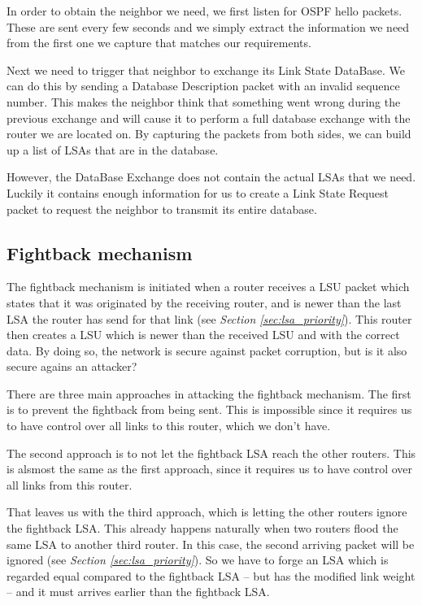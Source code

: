 \documentclass[11pt,a4paper,oneside]{article}
\newcommand{\lsubsection}[2]{\subsection{#1}\label{sec:#2}}
\begin{document}
    In order to obtain the neighbor we need, we first listen for OSPF hello packets.
    These are sent every few seconds and we simply extract the information we need from the first one we capture that matches our requirements.

    Next we need to trigger that neighbor to exchange its Link State DataBase.
    We can do this by sending a Database Description packet with an invalid sequence number.
    This makes the neighbor think that something went wrong during the previous exchange and will cause it to perform a full database exchange with the router we are located on.
    By capturing the packets from both sides, we can build up a list of LSAs that are in the database.

    However, the DataBase Exchange does not contain the actual LSAs that we need.
    Luckily it contains enough information for us to create a Link State Request packet to request the neighbor to transmit its entire database.

    \lsubsection{Fightback mechanism}{fightback}
    The fightback mechanism is initiated when a router receives a LSU packet which states that it was originated by the receiving router, and is newer than the last LSA the router has send for that link (see \textit{Section \ref{sec:lsa_priority}}). This router then creates a LSU which is newer than the received LSU and with the correct data. By doing so, the network is secure against packet corruption, but is it also secure agains an attacker?

    There are three main approaches in attacking the fightback mechanism. The first is to prevent the fightback from being sent. This is impossible since it requires us to have control over all links to this router, which we don't have.

    The second approach is to not let the fightback LSA reach the other routers. This is alsmost the same as the first approach, since it requires us to have control over all links from this router.

    That leaves us with the third approach, which is letting the other routers ignore the fightback LSA. This already happens naturally when two routers flood the same LSA to another third router. In this case, the second arriving packet will be ignored (see \textit{Section \ref{sec:lsa_priority}}). So we have to forge an LSA which is regarded equal compared to the fightback LSA -- but has the modified link weight -- and it must arrives earlier than the fightback LSA.
    
\end{document}
